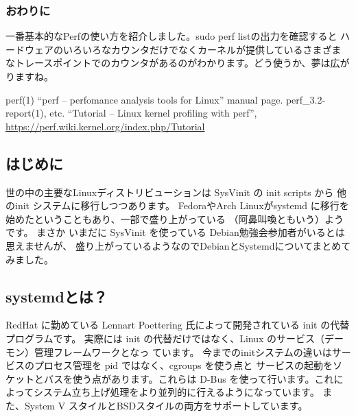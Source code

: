 \documentclass[mingoth,a4paper]{jsarticle}
\begin{document}
\subsubsection{おわりに}

一番基本的なPerfの使い方を紹介しました。sudo perf listの出力を確認すると
ハードウェアのいろいろなカウンタだけでなくカーネルが提供しているさまざま
なトレースポイントでのカウンタがあるのがわかります。どう使うか、夢は広が
りますね。

\begin{thebibliography}{98}
  perf(1) ``perf -- perfomance analysis tools for Linux''
	 manual page. perf\_{}3.2-report(1), etc.
 ``Tutorial -- Linux kernel profiling with
	perf'', 
	\url{https://perf.wiki.kernel.org/index.php/Tutorial}

\end{thebibliography}


\subsection{はじめに}
世の中の主要なLinuxディストリビューションは SysVinit の init scripts から
他のinit システムに移行しつつあります。
FedoraやArch Linuxがsystemd に移行を始めたということもあり、一部で盛り上がっている
（阿鼻叫喚ともいう）ようです。
まさか いまだに SysVinit を使っている Debian勉強会参加者がいるとは思えませんが、
盛り上がっているようなのでDebianとSystemdについてまとめてみました。

\subsection{systemdとは？}

RedHat に勤めている Lennart Poettering 氏によって開発されている init の代替プログラムです。
実際には init の代替だけではなく、Linux のサービス（デーモン）管理フレームワークとなっ
ています。
今までのinitシステムの違いはサービスのプロセス管理を pid ではなく、cgroups を使う点と
サービスの起動をソケットとバスを使う点があります。これらは D-Bus を使って行います。これによってシステム立ち上げ処理をより並列的に行えるようになっています。
また、System V スタイルとBSDスタイルの両方をサポートしています。
\end{document}
